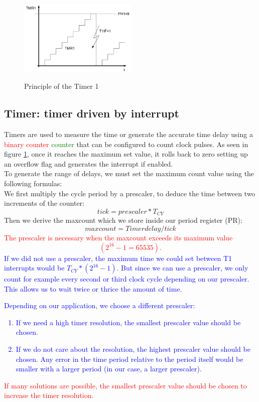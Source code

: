 \begin{figure}
    \caption{Principle of the Timer 1 \cite{alex}}
        \centering
            \includegraphics[width=0.5\textwidth]{figures/software/t1_demo.png}
            \label{fig:t1_demo}
\end{figure}

\subsection{Timer: timer driven by interrupt}


Timers are used to measure the time or generate the accurate time delay using a \textcolor{red}{binary counter} \textcolor{green}{counter} that can be configured to count clock pulses. As seen in figure \ref{fig:t1_demo}, once it reaches the maximum set value, it rolls back to zero setting up an overflow flag and generates the interrupt if enabled. \\

\noindent
To generate the range of delays, we must set the maximum count value using the following formulas:\\
We first multiply the cycle period by a prescaler, to deduce the time between two increments of the counter:
$$tick=prescaler*T_{CY}$$
Then we derive the maxcount which we store inside our period register (PR):
$$maxcount=Timer delay/tick$$
\textcolor{red}{The prescaler is necessary when the maxcount exceeds its maximum value $$(2^{16}-1=65535).$$ }
\textcolor{blue}{If we did not use a prescaler, the maximum time we could set between T1 interrupts would be $T_{CY}*(2^{16}-1)$. But since we can use a prescaler, we only count for example every second or third clock cycle depending on our prescaler. This allows us to wait twice or thrice the amount of time.}


\textcolor{blue}{Depending on our application, we choose a different prescaler:
\begin{enumerate}
    \item If we need a high timer resolution, the smallest prescaler value should be chosen. 
    \item If we do not care about the resolution, the highest prescaler value should be chosen. Any error in the time period relative to the period itself would be smaller with a larger period (in our case, a larger prescaler).
\end{enumerate}
}
\textcolor{red}{If many solutions are possible, the smallest prescaler value should be chosen to increase the timer resolution.}


